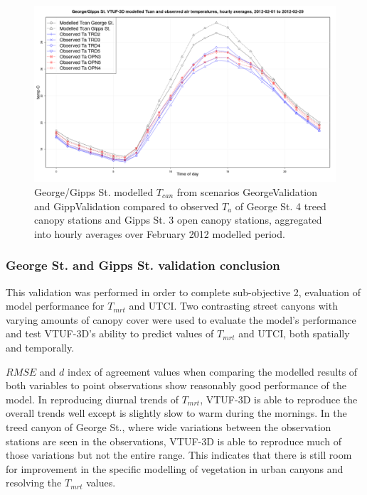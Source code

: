 \documentclass[final,3p,times,authoryear]{elsarticle}
\begin{document}
\begin{figure}[!htbp]
\includegraphics[trim = 0mm 0mm 0mm 0mm, clip, scale=0.30]{images/GeorgeValidationTcanAgg.png}
\caption{George/Gipps St. modelled $T_{can}$ from scenarios GeorgeValidation and GippValidation compared to observed $T_{a}$ of George St. 4 treed canopy stations and Gipps St. 3 open canopy stations, aggregated into hourly averages over February 2012 modelled period.\label{fig:GeorgeGippsStTcanCompare}} 
\end{figure}



\subsubsection{George St. and Gipps St. validation conclusion}
This validation was performed in order to complete sub-objective 2, evaluation of model performance for $T_{mrt}$ and UTCI. Two contrasting street canyons with varying amounts of canopy cover were used to evaluate the model's performance and test VTUF-3D's ability to predict values of $T_{mrt}$ and UTCI, both spatially and temporally. 

$RMSE$ and $d$ index of agreement values when comparing the modelled results of both variables to point observations show reasonably good performance of the model. In reproducing diurnal trends of $T_{mrt}$, VTUF-3D is able to reproduce the overall trends well except is slightly slow to warm during the mornings. In the treed canyon of George St., where wide variations between the observation stations are seen in the observations, VTUF-3D is able to reproduce much of those variations but not the entire range. This indicates that there is still room for improvement in the specific modelling of vegetation in urban canyons and resolving the $T_{mrt}$ values.
\end{document}
